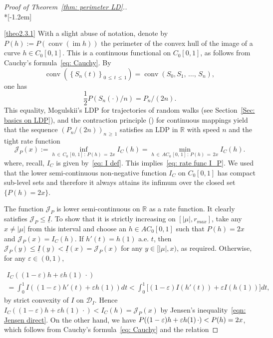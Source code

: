 \documentclass[10pt]{amsart}
\theoremstyle{definition}\newtheorem{defi}[theo]{Definition}\newtheorem{rema}[theo]{Remark}\newtheorem{exam}[theo]{Example}\newtheorem{exem}[theo]{Example}\newtheorem{nota}[theo]{Notation}
\DeclareMathOperator{\conv}{conv}
\DeclareMathOperator{\im}{im}
\newcommand{\ubar}[1]{\underline{#1}}
\newcommand{\Rbb}{\mathbb{R}}
\newcommand{\Dcl}{\mathcal{D}}
\newcommand{\Jcl}{\mathcal{J}}
\begin{document}
\begin{proof}[Proof of Theorem~\ref{thm: perimeter LD}.]\ \\*[-1.2em]

\eqref{theo2.3.1} With a slight abuse of notation, denote by $P(h):= P(\conv(\im h))$ the perimeter of the convex hull of the image of a curve $h \in C_0[0,1]$. This is a continuous functional on $C_0[0,1]$, as follows from Cauchy's formula~\eqref{eq: Cauchy}. By
\begin{equation}\label{eq: conve hull}
\conv \left(\left\{S_n(t) \right\}_{0\,\le\,t\,\le\,1}\right)=\conv(S_0,S_1,\,\ldots,\,S_n),
\end{equation}
one has
\[
\frac12 P(S_n(\cdot)/n)= P_n/(2n).
\]
This equality, Mogulskii's LDP for trajectories of random walks (see Section~\ref{Sec: basics on LDP}), and the contraction principle (\cite[Theorem~4.2.1]{DemboZeitouni}) for continuous mappings yield that the sequence $(P_n/(2n))_{n\,\ge\,1}$ satisfies an LDP in $\Rbb$ with speed $n$ and the tight rate function
\begin{equation}\label{eq: rate function I_P}
\Jcl_P(x):=\inf_{h\,\in\,C_0\,[0,\,1]\,: \, P(h)\,=\,2x} I_C(h)=\min_{h\,\in\,AC_0\,[0,\,1]\,:\, P(h)\,=\,2x} I_C(h).
\end{equation}
where, recall, $I_C$ is given by~\eqref{eq: I def}. This implies~\eqref{eq: rate func I_P}. We used that the lower semi-continuous non-negative function $I_C$ on $C_0[0,1]$ has compact sub-level sets and therefore it always attains its infimum over the closed set $\{P(h)=2x\}$.

The function $\Jcl_P$ is lower semi-continuous on $\Rbb$ as a rate function. It clearly satisfies $\Jcl_P \leqslant \ubar I $. To show that it is strictly increasing on $[|\mu|, r_{max}]$, take any $x\neq |\mu|$ from this interval and choose an $h \in AC_0[0,1]$ such that $P(h)=2x$ and $\Jcl_P(x)=I_C(h)$. If $h'(t) =h(1)$ a.e. $t$, then $\Jcl_P(y) \le \ubar I(y) < \ubar I(x) = \Jcl_P(x)$ for any $y \in [|\mu|, x)$, as required. Otherwise, for any $\varepsilon \in (0,1)$,

\begin{multline*}
I_C((1-\varepsilon) h + \varepsilon h(1) \, \cdot)\\
= \int_0^1 I((1-\varepsilon) h'(t) + \varepsilon h(1)) dt < \int_0^1 \big [(1-\varepsilon) I(h'(t))+ \varepsilon I(h(1)) \big] dt,
\end{multline*}
by strict convexity of $I$ on $\Dcl_I$. Hence $I_C((1-\varepsilon) h + \varepsilon h(1) \, \cdot)< I_C(h) = \Jcl_P(x)$ by Jensen's inequality~\eqref{eqn: Jensen direct}. On the other hand, we have $P((1-\varepsilon) h + \varepsilon h(1) \,\cdot)\linebreak<P(h) =2x$, which follows from Cauchy's formula~\eqref{eq: Cauchy} and the relation


\end{proof}
\end{document}
